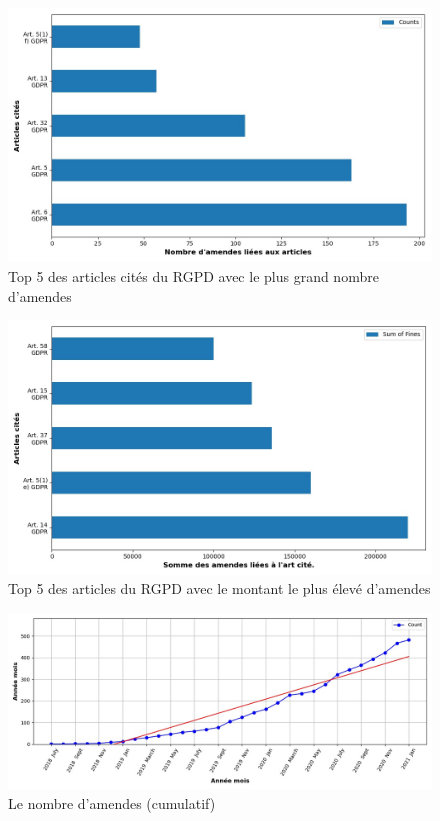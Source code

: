 \documentclass[french]{article}
\begin{document}
	\begin{multicols}{2}
	\begin{figure}
		[H]\centering\includegraphics[width=1\linewidth]{graphs/top10_quoted} 
		\caption{Top 5 des articles cités du RGPD avec le plus grand nombre d'amendes}
	\end{figure}
	\begin{figure}
		[H]\centering\includegraphics[width=1\linewidth]{graphs/top10_quoted_fines} 
		\caption{Top 5 des articles  du RGPD avec le montant le plus élevé d'amendes}
	\end{figure}
	\end{multicols}
	
	
	\begin{figure}
		[H]\centering\includegraphics[width=0.8\linewidth]{graphs/acc_nb_cases_graph}
		\caption{Le nombre d'amendes (cumulatif) }
	\end{figure}
	
\end{document}
